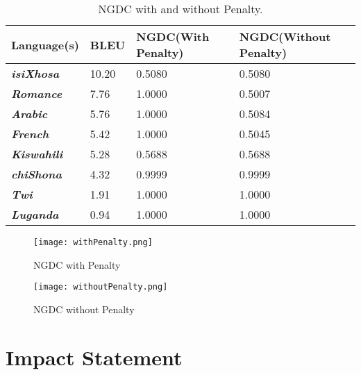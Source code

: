 \documentclass[11pt]{article}
\begin{document}
\begin{table*}
\centering

\begin{tabular}{|l|l|l|l|}
\hline
\textbf{Language(s)}        & \textbf{BLEU} & \textbf{NGDC(With Penalty)} & \textbf{NGDC(Without Penalty)} \\ \hline
\textit{\textbf{isiXhosa}}  & 10.20         & 0.5080                     & 0.5080                        \\ \hline
\textit{\textbf{Romance}}   & 7.76          & 1.0000                     & 0.5007                        \\ \hline
\textit{\textbf{Arabic}}    & 5.76          & 1.0000                     & 0.5084                        \\ \hline
\textit{\textbf{French}}    & 5.42          & 1.0000                     & 0.5045                        \\ \hline
\textit{\textbf{Kiswahili}} & 5.28          & 0.5688                     & 0.5688                        \\ \hline
\textit{\textbf{chiShona}}  & 4.32          & 0.9999                     & 0.9999                        \\ \hline
\textit{\textbf{Twi}}       & 1.91          & 1.0000                     & 1.0000                        \\ \hline
\textit{\textbf{Luganda}}   & 0.94          & 1.0000                     & 1.0000                        \\ \hline
\end{tabular}
\caption{NGDC with and without Penalty.}
\label{table:table2}
\end{table*}

\begin{figure*}[h!]
\centering
\texttt{[image: withPenalty.png]}
\caption{NGDC with Penalty}
\label{withPen}
\end{figure*}

\begin{figure*}[h!]
\centering
\texttt{[image: withoutPenalty.png]}
\caption{NGDC without Penalty}
\label{withoutPen}
\end{figure*}










\section{Impact Statement}
\end{document}
